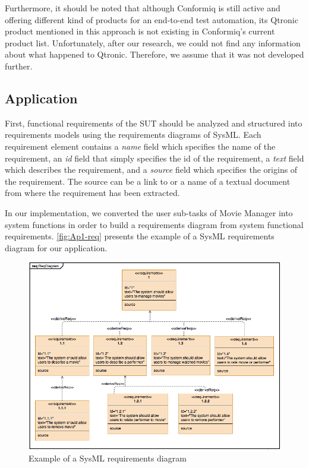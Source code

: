 Furthermore, it should be noted that although Conformiq is still active and offering different kind of products for an end-to-end test automation, its Qtronic product mentioned in this approach is not existing in Conformiq's current product list. Unfortunately, after our research, we could not find any information about what happened to Qtronic. Therefore, we assume that it was not developed further.





\subsection{Application}

First, functional requirements of the SUT should be analyzed and structured into requirements models using the requirements diagrams of SysML. Each requirement element contains a \textit{name} field which specifies the name of the requirement, an \textit{id} field that simply specifies the id of the requirement, a \textit{text} field which describes the requirement, and a \textit{source} field which specifies the origins of the requirement. The source can be a link to or a name of a textual document from where the requirement has been extracted. 

In our implementation, we converted the user sub-tasks of Movie Manager into system functions in order to build a requirements diagram from system functional requirements. \autoref{fig:Ap1-req} presents the example of a SysML requirements diagram for our application. 


\begin{figure} [H] 
\centering
\includegraphics[scale=0.49]{../images/Ap1-req} 
\caption{Example of a SysML requirements diagram}
\label{fig:Ap1-req}
\end{figure}

